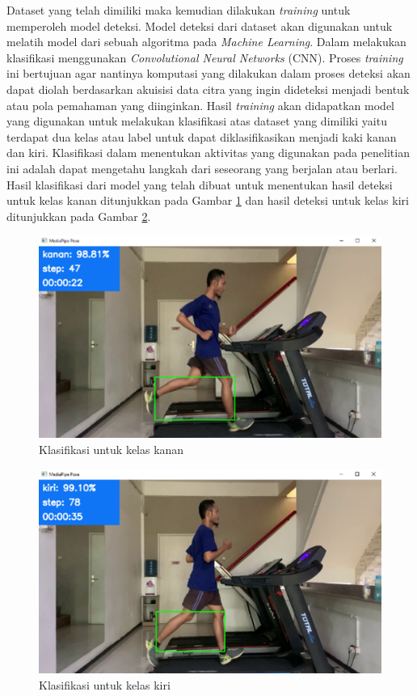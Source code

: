 Dataset yang telah dimiliki maka kemudian dilakukan \emph{training} untuk memperoleh model deteksi. Model deteksi dari dataset akan digunakan untuk melatih model dari sebuah algoritma pada \emph{Machine Learning}. Dalam melakukan klasifikasi menggunakan \emph{Convolutional Neural Networks} (CNN). Proses \emph{training} ini bertujuan agar nantinya komputasi yang dilakukan dalam proses deteksi akan dapat diolah berdasarkan akuisisi data citra yang ingin dideteksi menjadi bentuk atau pola pemahaman yang diinginkan. Hasil \emph{training} akan didapatkan model yang digunakan untuk melakukan klasifikasi atas dataset yang dimiliki yaitu terdapat dua kelas atau label untuk dapat diklasifikasikan menjadi kaki kanan dan kiri. Klasifikasi dalam menentukan aktivitas yang digunakan pada penelitian ini adalah dapat mengetahu langkah dari seseorang yang berjalan atau berlari. Hasil klasifikasi dari model yang telah dibuat untuk menentukan hasil deteksi untuk kelas kanan ditunjukkan pada Gambar \ref{fig:KlasifikasiKanan} dan hasil deteksi untuk kelas kiri ditunjukkan pada Gambar \ref{fig:KlasifikasiKiri}.

\begin{figure}[H]
  \centering
  \includegraphics[scale=0.8]{gambar/klasifikasi kanan.png}
  \caption{Klasifikasi untuk kelas kanan}
  \label{fig:KlasifikasiKanan}
\end{figure}

\begin{figure}[H]
  \centering
  \includegraphics[scale=0.8]{gambar/klasifikasi kiri.png}
  \caption{Klasifikasi untuk kelas kiri}
  \label{fig:KlasifikasiKiri}
\end{figure}


